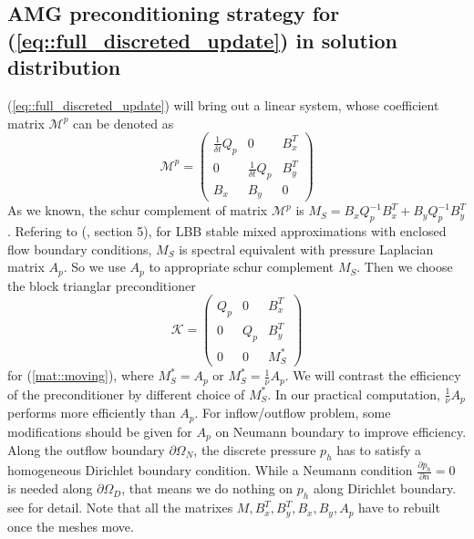 \documentclass{eajam}
\begin{document}
   \subsection{AMG preconditioning strategy for
     (\ref{eq::full_discreted_update}) in solution distribution}
   (\ref{eq::full_discreted_update}) will bring out a linear
   system, whose coefficient matrix $\mathcal{M}^p$ can be denoted as
   \begin{equation}
     \mathcal{M}^p = 
     \left(
       \begin{array}{lll}
         \frac{1}{\delta t} Q_p & 0 & B_x^T \\
         0 & \frac{1}{\delta t} Q_p & B_y^T \\
         B_x & B_y & 0
       \end{array}
     \right)
     \label{mat::moving}
   \end{equation}
   As we known, the schur complement of matrix $\mathcal{M}^p$ is 
   $M_S = B_x Q_p^{-1} B_x^T + B_y Q_p^{-1} B_y^T$. Refering to
   (\cite{elman2005finite}, section 5), for LBB stable mixed
   approximations with enclosed flow boundary conditions, $M_S$ is
   spectral equivalent with pressure Laplacian matrix $A_p$. So we
   use $A_p$ to appropriate schur complement $M_S$. Then we
   choose the block trianglar preconditioner
   \begin{equation}
     \mathcal{K} =
     \left(
       \begin{array}{lll}
         Q_p & 0 & B_x^T \\
         0 & Q_p & B_y^T \\
         0 & 0 & M_S^* 
       \end{array}
     \right)
     \label{eq::updateSolution_precond}
   \end{equation}
   for (\ref{mat::moving}), where $M_S^* = A_p$ or $M_S^* =
   \frac{1}{\nu} A_p$. We will contrast the efficiency of the
   preconditioner by different choice of $M_S^*$.  In our
   practical computation, $\frac{1}{\nu}A_p$ performs more efficiently
   than $A_p$. For inflow/outflow problem, some modifications should
   be given for $A_p$ on Neumann boundary to improve efficiency. Along 
   the outflow boundary $\partial \Omega_N$, the discrete pressure $p_h$
   has to satisfy a homogeneous Dirichlet boundary condition. While
   a Neumann condition $\frac{\partial p_h}{\partial n} = 0$ is
   needed along $\partial \Omega_D$, that means we do nothing on
   $p_h$ along Dirichlet boundary. see \cite{elman2009boundary}
   for detail.
   Note that all the matrixes $M, B_x^T, B_y^T, B_x,
   B_y, A_p$ have to rebuilt once the meshes move. 
\end{document}
